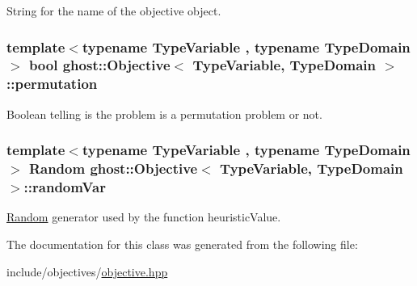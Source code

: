 String for the name of the objective object. 

\hypertarget{classghost_1_1Objective_aae8345f4b7981f4b386eb58e447e0286}{
\subsubsection[{permutation}]{\setlength{\rightskip}{0pt plus 5cm}template$<$typename Type\-Variable , typename Type\-Domain $>$ bool {\bf ghost\-::\-Objective}$<$ Type\-Variable, Type\-Domain $>$\-::permutation\hspace{0.3cm}{\ttfamily [protected]}}}\label{classghost_1_1Objective_aae8345f4b7981f4b386eb58e447e0286}


Boolean telling is the problem is a permutation problem or not. 

\hypertarget{classghost_1_1Objective_a442da333edc70f47c33a15987c2a81b8}{
\subsubsection[{random\-Var}]{\setlength{\rightskip}{0pt plus 5cm}template$<$typename Type\-Variable , typename Type\-Domain $>$ {\bf Random} {\bf ghost\-::\-Objective}$<$ Type\-Variable, Type\-Domain $>$\-::random\-Var\hspace{0.3cm}{\ttfamily [protected]}}}\label{classghost_1_1Objective_a442da333edc70f47c33a15987c2a81b8}


\hyperlink{classghost_1_1Random}{Random} generator used by the function heuristic\-Value. 



The documentation for this class was generated from the following file\-:\begin{DoxyCompactItemize}
\item 
include/objectives/\hyperlink{objective_8hpp}{objective.\-hpp}\end{DoxyCompactItemize}

